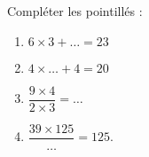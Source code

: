 
\begin{exercice}\label{exosmath-0822}

Compléter les pointillés :
\begin{multicols}{2}
    \begin{enumerate}
        \item
            \( 6\times 3+\ldots=23\)
        \item
            \( 4\times \ldots +4=20\)
        \item
            \( \dfrac{ 9\times 4 }{ 2\times 3 }=\ldots\)
        \item
            \( \dfrac{ 39\times 125 }{ \ldots }=125\).
    \end{enumerate}
\end{multicols}

\end{exercice}
